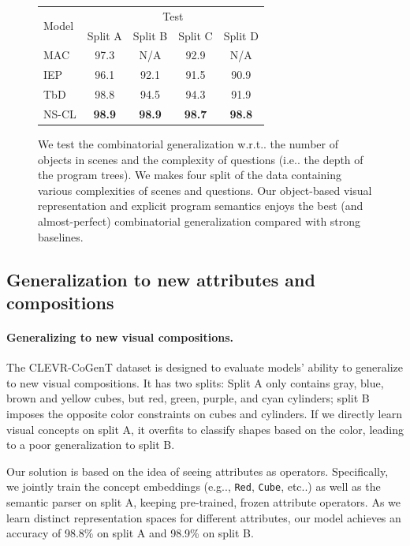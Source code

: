 \documentclass{article} %
\makeatletter
\def\vs{{\bm{s}}}
\DeclareRobustCommand\onedot{\futurelet\@let@token\@onedot}
\def\@onedot{\ifx\@let@token.\else.\null\fi\xspace}
\def\eg{e.g\onedot} \def\Eg{E.g\onedot}
\def\ie{i.e\onedot} \def\Ie{I.e\onedot}
\def\etc{etc\onedot} \def\vs{\emph{vs}\onedot}
\def\wrt{w.r.t\onedot} \def\dof{d.o.f\onedot}
\newcommand{\model}{NS-CL\xspace}
\makeatother
\begin{document}
\begin{figure}[t]
\begin{minipage}{0.4\textwidth}
\setlength{\tabcolsep}{2pt}
\begin{tabular}{lcccc}
\toprule
\multirow{2}{*}{Model} & \multicolumn{4}{c}{Test}\\
\cmidrule{2-5}
 & Split A & Split B & Split C & Split D \\ \midrule
MAC  & 97.3    & N/A  & 92.9 & N/A     \\
IEP  & 96.1    & 92.1 & 91.5 &   90.9    \\
%
TbD  & 98.8  & 94.5 & 94.3 & 91.9    \\ \midrule
\model      & \textbf{98.9}    & \textbf{98.9} & \textbf{98.7} & \textbf{98.8}    \\ \bottomrule
\end{tabular}
\caption{We test the combinatorial generalization \wrt the number of objects in scenes and the complexity of questions (\ie the depth of the program trees). We makes four split of the data containing various complexities of scenes and questions. Our object-based visual representation and explicit program semantics enjoys the best (and almost-perfect) combinatorial generalization compared with strong baselines.}
\label{tab:expr:combinatorial}
\end{minipage}

%
%
%
%
%
%
%
%
%
%
%
%
%
%
%
%
%
%
%
\end{figure}

\subsection{Generalization to new attributes and compositions}
\label{sec:expr:comb}

\paragraph{Generalizing to new visual compositions.} The CLEVR-CoGenT dataset is designed to evaluate models' ability to generalize to new visual compositions. It has two splits: Split A only contains gray, blue, brown and yellow cubes, but red, green, purple, and cyan cylinders; split B imposes the opposite color constraints on cubes and cylinders. If we directly learn visual concepts on split A, it overfits to classify shapes based on the color, leading to a poor generalization to split B.

Our solution is based on the idea of seeing attributes as operators. Specifically, we jointly train the concept embeddings (\eg, \texttt{Red}, \texttt{Cube}, \etc) as well as the semantic parser on split A, keeping pre-trained, frozen attribute operators. As we learn distinct representation spaces for different attributes, our model achieves an accuracy of 98.8\% on split A and 98.9\% on split B.
\end{document}
